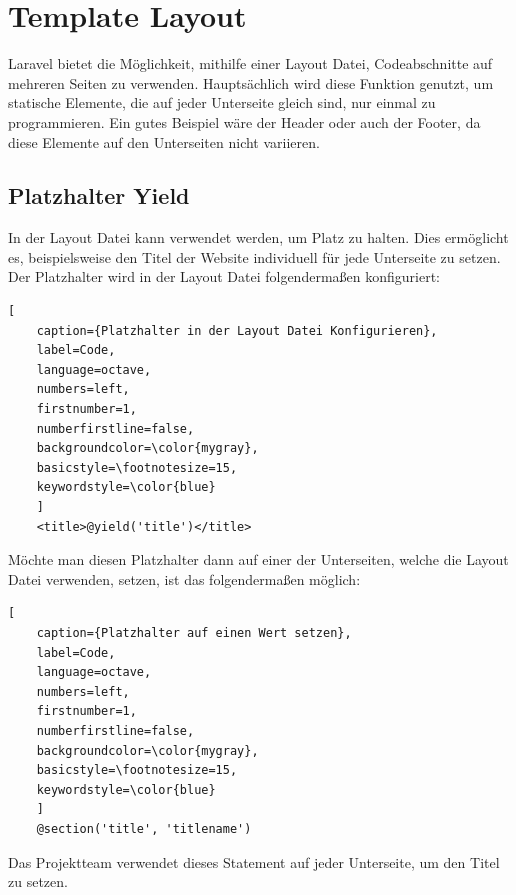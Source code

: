 \section{Template Layout}\label{sec: Layout}
Laravel bietet die Möglichkeit, mithilfe einer Layout Datei, Codeabschnitte auf mehreren Seiten zu verwenden. Hauptsächlich wird diese Funktion genutzt, um statische Elemente, die auf jeder Unterseite gleich sind, nur einmal zu programmieren. Ein gutes Beispiel wäre der Header oder auch der Footer, da diese Elemente auf den Unterseiten nicht variieren. 

\subsection{Platzhalter Yield}
In der Layout Datei kann \@yield verwendet werden, um Platz zu halten. Dies ermöglicht es, beispielsweise den Titel der Website individuell für jede Unterseite zu setzen. Der Platzhalter wird in der Layout Datei folgendermaßen konfiguriert: 
\renewcommand{\lstlistingname}{Quellcode}

\begin{lstlisting}[
	caption={Platzhalter in der Layout Datei Konfigurieren},
	label=Code,
	language=octave,
	numbers=left,
	firstnumber=1,
	numberfirstline=false,
	backgroundcolor=\color{mygray},
	basicstyle=\footnotesize=15,
	keywordstyle=\color{blue}
	]
	<title>@yield('title')</title>
\end{lstlisting} 
Möchte man diesen Platzhalter dann auf einer der Unterseiten, welche die Layout Datei verwenden, setzen, ist das folgendermaßen möglich:
\begin{lstlisting}[
	caption={Platzhalter auf einen Wert setzen},
	label=Code,
	language=octave,
	numbers=left,
	firstnumber=1,
	numberfirstline=false,
	backgroundcolor=\color{mygray},
	basicstyle=\footnotesize=15,
	keywordstyle=\color{blue}
	]
	@section('title', 'titlename')
\end{lstlisting} 
Das Projektteam verwendet dieses Statement auf jeder Unterseite, um den Titel zu setzen.

